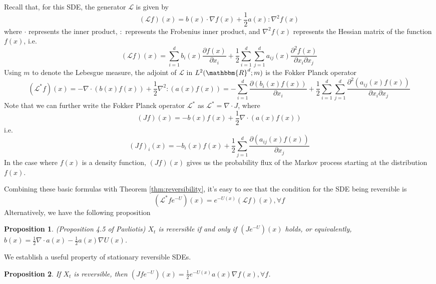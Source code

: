 \documentclass[english, aip, jcp, priprint, graphicx,floatfix]{revtex4-1}
\newtheorem{proposition}{Proposition}
\theoremstyle{plain}
\theoremstyle{definition}
\theoremstyle{plain}
\begin{document}
Recall that, for this SDE, the generator $\mathcal{L}$ is given by
\[ (\mathcal{L} f) (x) = b (x) \cdot \nabla f (x) + \frac{1}{2} a (x) :
\nabla^2 f (x) \]
where $\cdot$ represents the inner product, $:$ represents the Frobenius inner
product, and $\nabla^2 f (x)$ represents the Hessian matrix of the function $f
(x)$, i.e.
\[ (\mathcal{L} f) (x) = \sum_{i = 1}^d b_i (x) \frac{\partial f
(x)}{\partial x_i} + \frac{1}{2} \sum_{i = 1}^d \sum_{j = 1}^d a_{ij} (x)
\frac{\partial^2 f (x)}{\partial x_i \partial x_j} \]
Using $m$ to denote the Lebesgue measure, the adjoint of $\mathcal{L}$ in $L^2
(\mathbbm{R}^d ; m)$ is the Fokker Planck operator
\[ (\mathcal{L}^{\ast} f) (x) = - \nabla \cdot (b (x) f (x)) + \frac{1}{2}
\nabla^2 : (a (x) f (x)) = - \sum_{i = 1}^d \frac{\partial (b_i (x) f
(x))}{\partial x_i} + \frac{1}{2} \sum_{i = 1}^d \sum_{j = 1}^d
\frac{\partial^2 (a_{ij} (x) f (x))}{\partial x_i \partial x_j} \]
Note that we can further write the Fokker Planck operator $\mathcal{L}^{\ast}$
as $\mathcal{L}^{\ast} = \nabla \cdot J$, where
\[ (J f) (x) = - b (x) f (x) + \frac{1}{2} \nabla \cdot (a (x) f (x)) \]
i.e.
\[ (J f)_i (x) = - b_i (x) f (x) + \frac{1}{2} \sum_{j = 1}^d \frac{\partial
(a_{ij} (x) f (x))}{\partial x_j} \]
In the case where $f (x)$ is a density function, $(J f) (x)$ gives us the
probability flux of the Markov process starting at the distribution $f (x)$.

Combining these basic formulas with Theorem \ref{thm:reversibility}, it's easy
to see that the condition for the SDE being reversible is
\[ (\mathcal{L}^{\ast} f e^{-U}) (x) = e^{- U (x)} (\mathcal{L} f) (x),
\forall f \]
Alternatively, we have the following proposition

\begin{proposition}
(Proposition 4.5 of Pavliotis\cite{Pavliotis2016-xn}) $X_t$ is reversible if
and only if $(J e^{- U })(x)$ holds, or equivalently, $b (x) = \frac{1}{2}
\nabla \cdot a (x) - \frac{1}{2} a (x) \nabla U (x)$.
\end{proposition}

We establish a useful property of stationary reversible SDEs.

\begin{proposition}\label{prop:property_reversible_sde}
If $X_t$ is reversible, then $(J f e^{- U })(x) = \frac{1}{2} e^{- U
(x)} a (x) \nabla f (x) , \forall f$.
\end{proposition}
\end{document}

